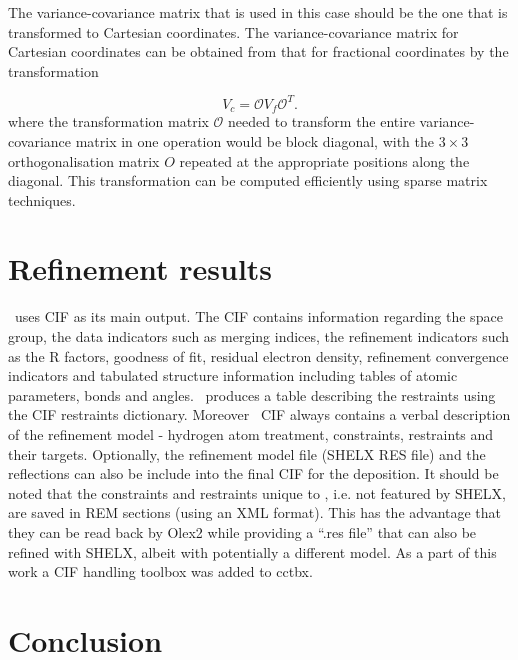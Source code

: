 \documentclass[pdf]{iucr}
\newcommand{\mat}[1]{#1}
\begin{document}
The variance-covariance matrix that is used in this case should be the one that is transformed to Cartesian coordinates. The variance-covariance matrix for Cartesian coordinates can be obtained from that for fractional coordinates by the transformation

\begin{equation}
\mat{V}_{c} = \mat{\mathcal{O}} \mat{V}_{f} \mat{\mathcal{O}}^{T}.
\label{eqn:vcv_cart}
\end{equation}
where the transformation matrix $\mathcal{O}$ needed to transform the entire variance-covariance matrix in one operation would be block diagonal, with the $3 \times 3$ orthogonalisation matrix $O$ repeated at the appropriate positions along the diagonal. This transformation can be computed efficiently using sparse matrix techniques.

\section{Refinement results}

\olexrefine\ uses CIF  as its main output. The CIF contains information regarding the space group, the data indicators such as merging indices, the refinement indicators such as the R factors, goodness of fit, residual electron density, refinement convergence indicators and tabulated structure information including tables of atomic parameters, bonds and angles. \olexrefine\ produces a table describing the restraints using the CIF restraints dictionary. Moreover \olexrefine\ CIF always contains a verbal description of the refinement model - hydrogen atom treatment, constraints, restraints and their targets. Optionally, the refinement model file (SHELX RES file) and the reflections can also be include into the final CIF for the deposition. It should be noted that the constraints and restraints unique to \olexrefine, i.e. not featured by SHELX, are saved in REM sections (using an XML format). This has the advantage that they can be read back by Olex2 while providing a ``.res file'' that can also be refined with SHELX, albeit with potentially a different model. As a part of this work a CIF handling toolbox  was added to cctbx.

\section{Conclusion}
\end{document}
